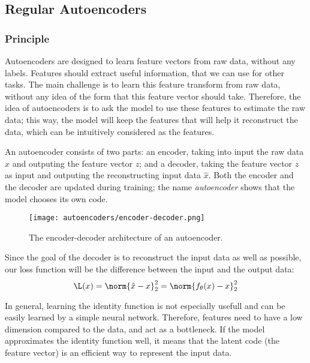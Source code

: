 \subsection{Regular Autoencoders}
\subsubsection{Principle}
Autoencoders are designed to learn feature vectors from raw data, without any labels. Features should extract useful information, that we can use for other tasks. The main challenge is to learn this feature transform from raw data, without any idea of the form that this feature vector should take. Therefore, the idea of autoencoders is to ask the model to use these features to estimate the raw data; this way, the model will keep the features that will help it reconstruct the data, which can be intuitively considered as the  features.

An autoencoder consists of two parts: an encoder, taking into input the raw data $x$ and outputing the feature vector $z$; and a decoder, taking the feature vector $z$ as input and outputing the reconstructing input data $\hat{x}$. Both the encoder and the decoder are updated during training; the name \emph{autoencoder} shows that the model chooses its own code.
\begin{figure}[H]
    \centering
    \texttt{[image: autoencoders/encoder-decoder.png]}
    \caption{The encoder-decoder architecture of an autoencoder.}
\end{figure}
Since the goal of the decoder is to reconstruct the input data as well as possible, our loss function will be the difference between the input and the output data:
\begin{equation*}
    \L(x) = \norm{\hat{x}-x}_2^2 = \norm{f_\theta(x)-x}_2^2
\end{equation*}

In general, learning the identity function is not especially usefull and can be easily learned by a simple neural network. Therefore, features need to have a low dimension compared to the data, and act as a bottleneck. If the model approximates the identity function well, it means that the latent code (the feature vector) is an efficient way to represent the input data.

